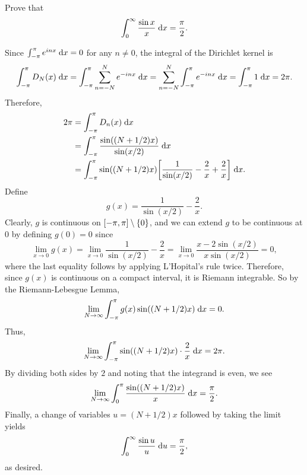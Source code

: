 \begin{exrc}[12]
    Prove that
    \begin{equation*}
        \int_{0}^{\infty} \frac{\sin x}{x} \;\mathrm d x = \frac{\pi}{2}.
    \end{equation*}

\begin{soln}
    Since \(\int_{-\pi}^{\pi} e^{inx} \;\mathrm d x = 0\) for any \(n \neq 0\),
    the integral of the Dirichlet kernel is
    \begin{equation*}
        \int_{-\pi}^{\pi} D_N(x) \;\mathrm d x
        = \int_{-\pi}^{\pi} \sum_{n = -N}^{N} e^{-inx} \;\mathrm d x
        = \sum_{n = -N}^{N} \int_{-\pi}^{\pi} e^{-inx} \;\mathrm d x
        = \int_{-\pi}^{\pi} 1 \;\mathrm d x
        = 2\pi.
    \end{equation*}
    Therefore,
    \begin{align*}
        2\pi
        &= \int_{-\pi}^{\pi} D_n(x) \ud x \\
        &= \int_{-\pi}^{\pi} \frac{\sin((N + 1 / 2)x)}{\sin(x / 2)} \ud x \\
        &= \int_{-\pi}^{\pi} \sin\br{(N + 1/2)x} \sqbr{\frac{1}{\sin(x/2)}
        - \frac{2}{x} + \frac{2}{x}} \ud x.
    \end{align*}
    Define
    \begin{equation*}
        g(x) = \frac{1}{\sin(x / 2)} - \frac{2}{x}.
    \end{equation*}
    Clearly, \(g\) is continuous on \([-\pi, \pi] \setminus \set{0}\),
    and we can extend \(g\) to be continuous at 0 by defining \(g(0) = 0\) since
    \begin{equation*}
        \lim_{x \to 0} g(x)
        = \lim_{x \to 0} \frac{1}{\sin(x / 2)} - \frac{2}{x}
        = \lim_{x \to 0} \frac{x - 2\sin(x / 2)}{x \sin(x / 2)}
        = 0,
    \end{equation*}
    where the last equality follows by applying L'Hopital's rule twice.
    Therefore, since \(g(x)\) is continuous on a compact interval, it is Riemann integrable.
    So by the Riemann-Lebesgue Lemma,
    \begin{equation*}
        \lim_{N \to \infty} \int_{-\pi}^{\pi} g(x) \sin((N + 1 / 2)x) \;\mathrm d x = 0.
    \end{equation*}
    Thus,
    \begin{equation*}
        \lim_{N \to \infty} \int_{-\pi}^{\pi} \sin((N + 1/2)x) \cdot \frac{2}{x} \;\mathrm d x = 2\pi.
    \end{equation*}
    By dividing both sides by \(2\) and noting that the integrand is even, we see
    \begin{equation*}
        \lim_{N \to \infty} \int_{0}^{\pi} \frac{\sin((N + 1/2)x)}{x} \;\mathrm d x = \frac{\pi}{2}.
    \end{equation*}
    Finally, a change of variables \(u = (N + 1/2)x\) followed by taking the limit yields
    \begin{equation*}
        \int_{0}^{\infty} \frac{\sin u}{u} \;\mathrm d u = \frac{\pi}{2},
    \end{equation*}
    as desired.


\end{soln}
\end{exrc}
